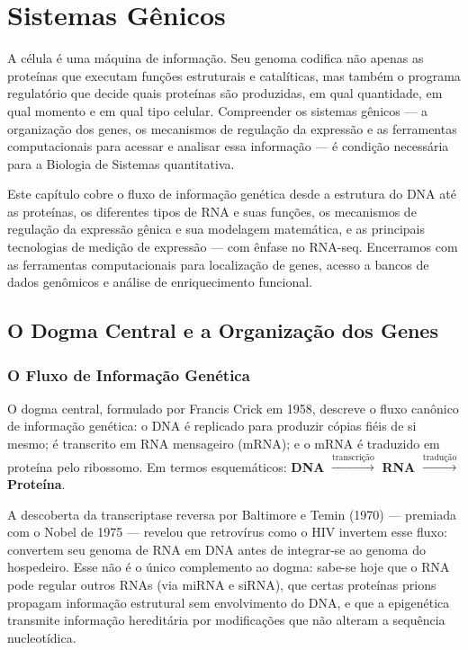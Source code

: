 \chapter{Sistemas Gênicos}
\label{cap:06}

A célula é uma máquina de informação. Seu genoma codifica não apenas as proteínas que
executam funções estruturais e catalíticas, mas também o programa regulatório que decide
quais proteínas são produzidas, em qual quantidade, em qual momento e em qual tipo celular.
Compreender os sistemas gênicos --- a organização dos genes, os mecanismos de regulação da
expressão e as ferramentas computacionais para acessar e analisar essa informação --- é
condição necessária para a Biologia de Sistemas quantitativa.

Este capítulo cobre o fluxo de informação genética desde a estrutura do DNA até as
proteínas, os diferentes tipos de RNA e suas funções, os mecanismos de regulação da
expressão gênica e sua modelagem matemática, e as principais tecnologias de medição de
expressão --- com ênfase no RNA-seq. Encerramos com as ferramentas computacionais para
localização de genes, acesso a bancos de dados genômicos e análise de enriquecimento
funcional.

\section{O Dogma Central e a Organização dos Genes}

\subsection{O Fluxo de Informação Genética}

\begin{definicaoenv}
O dogma central, formulado por Francis Crick em 1958, descreve o fluxo canônico de
informação genética: o DNA é replicado para produzir cópias fiéis de si mesmo; é
transcrito em RNA mensageiro (mRNA); e o mRNA é traduzido em proteína pelo ribossomo.
Em termos esquemáticos: \textbf{DNA} $\xrightarrow{\text{transcrição}}$ \textbf{RNA}
$\xrightarrow{\text{tradução}}$ \textbf{Proteína}.
\end{definicaoenv}

A descoberta da transcriptase reversa por Baltimore e Temin (1970) --- premiada com o Nobel
de 1975 --- revelou que retrovírus como o HIV invertem esse fluxo: convertem seu genoma de
RNA em DNA antes de integrar-se ao genoma do hospedeiro. Esse não é o único complemento ao
dogma: sabe-se hoje que o RNA pode regular outros RNAs (via miRNA e siRNA), que certas
proteínas prions propagam informação estrutural sem envolvimento do DNA, e que a epigenética
transmite informação hereditária por modificações que não alteram a sequência nucleotídica.

